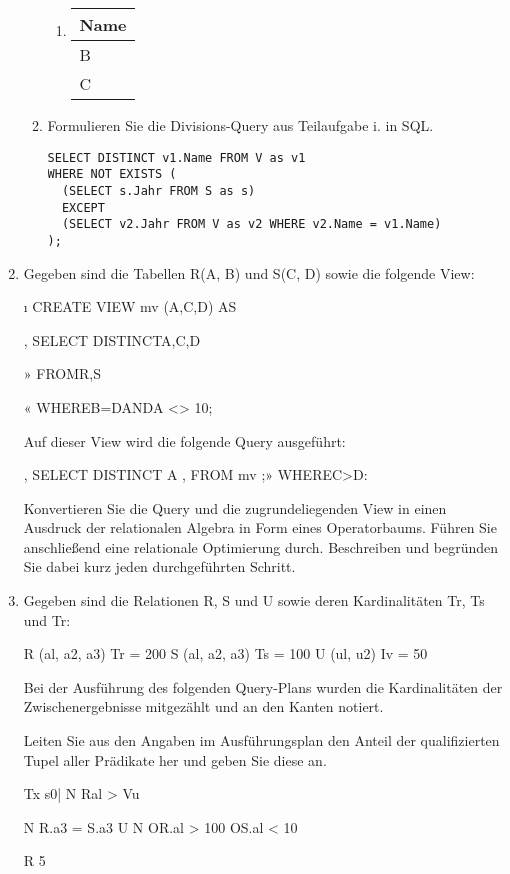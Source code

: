 \documentclass{lehramt-informatik-aufgabe}
\begin{document}
\begin{enumerate}
\begin{enumerate}
\begin{liAntwort}
\begin{enumerate}
\item

\begin{tabular}{|l|}
\hline
Name \\\hline\hline
B \\\hline
C \\\hline
\end{tabular}
\end{enumerate}
\end{liAntwort}


\item Formulieren Sie die Divisions-Query aus Teilaufgabe i. in SQL.

\begin{verbatim}
SELECT DISTINCT v1.Name FROM V as v1
WHERE NOT EXISTS (
  (SELECT s.Jahr FROM S as s)
  EXCEPT
  (SELECT v2.Jahr FROM V as v2 WHERE v2.Name = v1.Name)
);
\end{verbatim}

\end{enumerate}


\item Gegeben sind die Tabellen R(A, B) und S(C, D) sowie die folgende View:

ı CREATE VIEW mv (A,C,D) AS

, SELECT DISTINCTA,C,D

»  FROMR,S

« WHEREB=DANDA <> 10;

Auf dieser View wird die folgende Query ausgeführt:

, SELECT DISTINCT A
, FROM mv
;» WHEREC>D:

Konvertieren Sie die Query und die zugrundeliegenden View in einen
Ausdruck der relationalen Algebra in Form eines Operatorbaums. Führen
Sie anschließend eine relationale Optimierung durch. Beschreiben und
begründen Sie dabei kurz jeden durchgeführten Schritt.


\item Gegeben sind die Relationen R, S und U sowie deren Kardinalitäten
Tr, Ts und Tr:

R (al, a2, a3) Tr = 200
S (al, a2, a3) Ts = 100
U (ul, u2) Iv = 50

Bei der Ausführung des folgenden Query-Plans wurden die Kardinalitäten
der Zwischenergebnisse mitgezählt und an den Kanten notiert.

Leiten Sie aus den Angaben im Ausführungsplan den Anteil der
qualifizierten Tupel aller Prädikate her und geben Sie diese an.

Tx
s0|
N Ral > Vu

N R.a3 = S.a3 U
 N
OR.al > 100 OS.al < 10

R 5
\end{enumerate}
\end{document}
